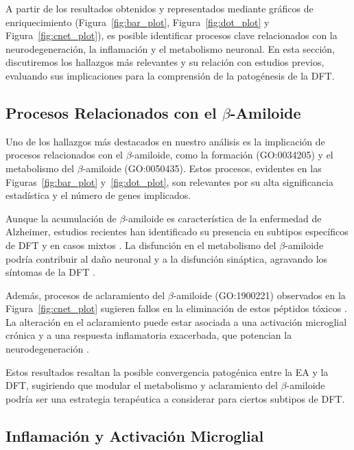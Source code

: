 A partir de los resultados obtenidos y representados mediante gráficos de enriquecimiento (Figura~\ref{fig:bar_plot}, Figura~\ref{fig:dot_plot} y Figura~\ref{fig:cnet_plot}), es posible identificar procesos clave relacionados con la neurodegeneración, la inflamación y el metabolismo neuronal. En esta sección, discutiremos los hallazgos más relevantes y su relación con estudios previos, evaluando sus implicaciones para la comprensión de la patogénesis de la DFT.

\subsection{Procesos Relacionados con el \(\beta\)-Amiloide}

Uno de los hallazgos más destacados en nuestro análisis es la implicación de procesos relacionados con el \(\beta\)-amiloide, como la formación (GO:0034205) y el metabolismo del \(\beta\)-amiloide (GO:0050435). Estos procesos, evidentes en las Figuras~\ref{fig:bar_plot} y~\ref{fig:dot_plot}, son relevantes por su alta significancia estadística y el número de genes implicados.

Aunque la acumulación de \(\beta\)-amiloide es característica de la enfermedad de Alzheimer, estudios recientes han identificado su presencia en subtipos específicos de DFT y en casos mixtos \cite{hardy2002amyloid, ling2010frontotemporal}. La disfunción en el metabolismo del \(\beta\)-amiloide podría contribuir al daño neuronal y a la disfunción sináptica, agravando los síntomas de la DFT \cite{selkoe2002alzheimers}.

Además, procesos de aclaramiento del \(\beta\)-amiloide (GO:1900221) observados en la Figura~\ref{fig:cnet_plot} sugieren fallos en la eliminación de estos péptidos tóxicos \cite{heneka2015neuroinflammation}. La alteración en el aclaramiento puede estar asociada a una activación microglial crónica y a una respuesta inflamatoria exacerbada, que potencian la neurodegeneración \cite{chen2016microglia}.

Estos resultados resaltan la posible convergencia patogénica entre la EA y la DFT, sugiriendo que modular el metabolismo y aclaramiento del \(\beta\)-amiloide podría ser una estrategia terapéutica a considerar para ciertos subtipos de DFT.


\subsection{Inflamación y Activación Microglial}

